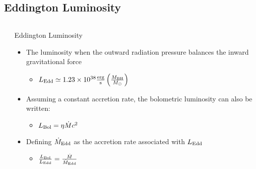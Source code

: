 \documentclass[landscape,9pt]{beamer}
\begin{document}
\subsection{Eddington Luminosity}
\begin{frame}
	\begin{columns}
	\begin{column}{.2\textwidth}
	\end{column}
	\begin{column}{.8\textwidth}
		\begin{block}{Eddington Luminosity}
		\begin{itemize}
			\item The luminosity when the outward radiation pressure balances the inward gravitational force
			\begin{itemize}
				\item $L_{\rm Edd} \simeq 1.23 \times 10^{38} \frac{\rm erg}{\rm s} \left( \frac{M_{\rm BH}}{M_{\odot}} \right)$
			\end{itemize}
			\item Assuming a constant accretion rate, the bolometric luminosity can also be written:
			\begin{itemize}
				\item $L_{\rm Bol}=\eta \dot{M} c^2$
			\end{itemize}
			\item Defining $\dot{M}_{\rm Edd}$ as the accretion rate associated with $L_{\rm Edd}$
			\begin{itemize}
				\item $\frac{L_{\rm Bol}}{L_{\rm Edd}} = \frac{\dot{M}}{\dot{M}_{\rm Edd}}$
			\end{itemize}
		\end{itemize}
		\end{block}
	\end{column}
	\end{columns}
\end{frame}
\end{document}
